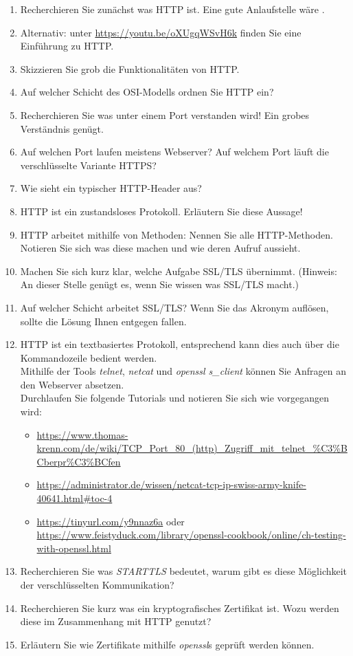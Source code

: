 \documentclass[paper=a4,fontsize=11pt]{scrartcl}%
\numberwithin{equation}{section}
\begin{document}
\begin{enumerate}
	\item Recherchieren Sie zunächst was HTTP ist. Eine gute Anlaufstelle wäre \cite[S. 98ff]{Kurose2012}.
	\item Alternativ: unter \url{https://youtu.be/oXUgqWSvH6k} finden Sie eine Einführung zu HTTP.
	\item Skizzieren Sie grob die Funktionalitäten von HTTP.
	\item Auf welcher Schicht des OSI-Modells ordnen Sie HTTP ein?
	\item Recherchieren Sie was unter einem Port verstanden wird! Ein grobes Verständnis genügt.
	\item Auf welchen Port laufen meistens Webserver? Auf welchem Port läuft die verschlüsselte Variante HTTPS?
	\item Wie sieht ein typischer HTTP-Header aus?
	\item HTTP ist ein zustandsloses Protokoll. Erläutern Sie diese Aussage!
	\item HTTP arbeitet mithilfe von Methoden: Nennen Sie alle HTTP-Methoden. Notieren Sie sich was diese machen und wie deren Aufruf aussieht.
	\item Machen Sie sich kurz klar, welche Aufgabe SSL/TLS übernimmt. (Hinweis: An dieser Stelle genügt es, wenn Sie wissen was SSL/TLS macht.)
	\item Auf welcher Schicht arbeitet SSL/TLS? Wenn Sie das Akronym auflösen, sollte die Lösung Ihnen entgegen fallen.
	\item HTTP ist ein textbasiertes Protokoll, entsprechend kann dies auch über die Kommandozeile bedient werden.\\
	Mithilfe der Tools \emph{telnet}, \emph{netcat} und \emph{openssl s\_client} können Sie Anfragen an den Webserver absetzen.\\
	Durchlaufen Sie folgende Tutorials und notieren Sie sich wie vorgegangen wird:
	\begin{itemize}
		\item \url{https://www.thomas-krenn.com/de/wiki/TCP_Port_80_(http)_Zugriff_mit_telnet_%C3%BCberpr%C3%BCfen}
		\item \url{https://administrator.de/wissen/netcat-tcp-ip-swiss-army-knife-40641.html#toc-4}
		\item  \url{https://tinyurl.com/y9nnaz6a} oder \url{https://www.feistyduck.com/library/openssl-cookbook/online/ch-testing-with-openssl.html}
	\end{itemize}
	\item Recherchieren Sie was \emph{STARTTLS} bedeutet, warum gibt es diese Möglichkeit der verschlüsselten Kommunikation?
	\item Recherchieren Sie kurz was ein kryptografisches Zertifikat ist. Wozu werden diese im Zusammenhang mit HTTP genutzt?
	\item Erläutern Sie wie Zertifikate mithilfe \emph{openssl}s geprüft werden können.  
\end{enumerate}
\end{document}
